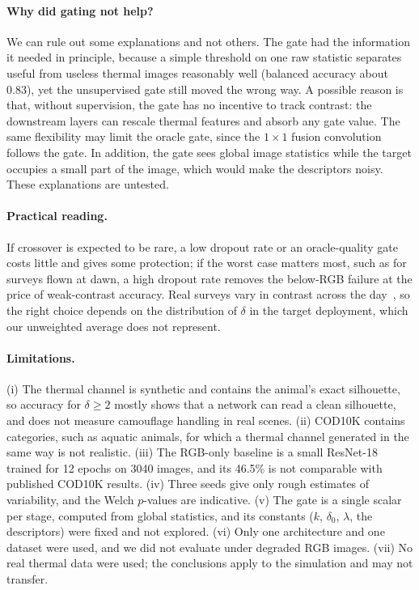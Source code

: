 \documentclass[runningheads]{llncs}
\begin{document}
\paragraph{Why did gating not help?} We can rule out some explanations and not others. The gate had the information it needed in principle, because a simple threshold on one raw statistic separates useful from useless thermal images reasonably well (balanced accuracy about 0.83), yet the unsupervised gate still moved the wrong way. A possible reason is that, without supervision, the gate has no incentive to track contrast: the downstream layers can rescale thermal features and absorb any gate value. The same flexibility may limit the oracle gate, since the $1\times1$ fusion convolution follows the gate. In addition, the gate sees global image statistics while the target occupies a small part of the image, which would make the descriptors noisy. These explanations are untested.

\paragraph{Practical reading.} If crossover is expected to be rare, a low dropout rate or an oracle-quality gate costs little and gives some protection; if the worst case matters most, such as for surveys flown at dawn, a high dropout rate removes the below-RGB failure at the price of weak-contrast accuracy. Real surveys vary in contrast across the day~\cite{kays,whitworth}, so the right choice depends on the distribution of $\delta$ in the target deployment, which our unweighted average does not represent.

\paragraph{Limitations.} (i) The thermal channel is synthetic and contains the animal's exact silhouette, so accuracy for $\delta\geq2$ mostly shows that a network can read a clean silhouette, and does not measure camouflage handling in real scenes. (ii) COD10K contains categories, such as aquatic animals, for which a thermal channel generated in the same way is not realistic. (iii) The RGB-only baseline is a small ResNet-18 trained for 12 epochs on 3040 images, and its 46.5\% is not comparable with published COD10K results. (iv) Three seeds give only rough estimates of variability, and the Welch $p$-values are indicative. (v) The gate is a single scalar per stage, computed from global statistics, and its constants ($k$, $\delta_0$, $\lambda$, the descriptors) were fixed and not explored. (vi) Only one architecture and one dataset were used, and we did not evaluate under degraded RGB images. (vii) No real thermal data were used; the conclusions apply to the simulation and may not transfer.
\end{document}
